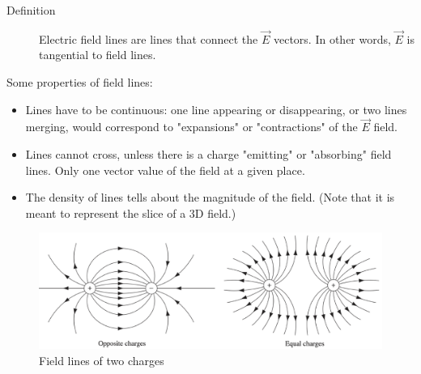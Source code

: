 \documentclass[12pt,a4paper,twoside]{article}
\begin{document}
    \begin{description}
        \item[Definition] Electric field lines are lines that connect the $\overrightarrow{E}$ vectors. In other words, $\overrightarrow{E}$ is tangential to field lines.
    \end{description}
    Some properties of field lines:
    \begin{itemize}
        \item Lines have to be continuous: one line appearing or disappearing, or two lines merging, would correspond to "expansions" or "contractions" of the $\overrightarrow{E}$ field.
        \item Lines cannot cross, unless there is a charge "emitting" or "absorbing" field lines. Only one vector value of the field at a given place.
        \item The density of lines tells about the magnitude of the field. (Note that it is meant to represent the slice of a 3D field.)
    \end{itemize}
    \begin{figure}
        \centering
        \includegraphics[width=12cm]{250-Revision/field-lines-eg.png}
        \caption{Field lines of two charges}
        \label{fig:field-line-eg}
    \end{figure}
    
\end{document}

